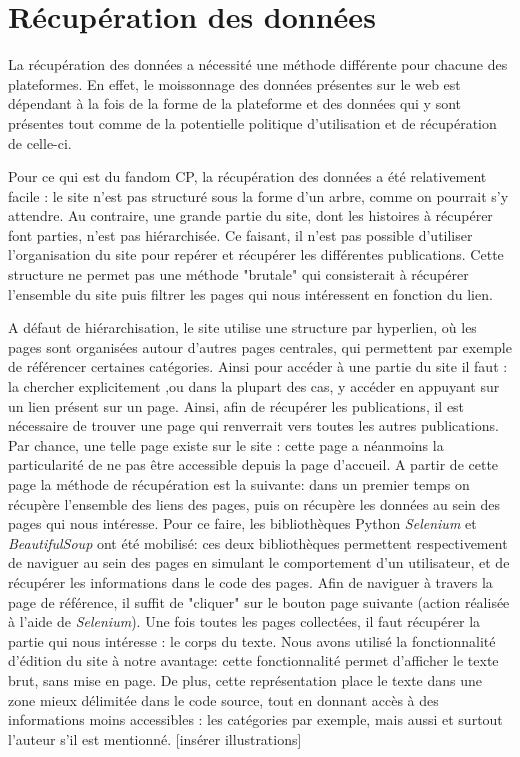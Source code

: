 \documentclass[12pt,a4paper,oneside,titlepage]{article} %
\begin{document}
	
	\section*{Récupération des données}
	
	La récupération des données a nécessité une méthode différente pour chacune des plateformes.  En effet, le moissonnage des données présentes sur le web est dépendant à la fois de la forme de la plateforme et des données qui y sont présentes tout comme de la potentielle politique d'utilisation et de récupération de celle-ci. 
	
	Pour ce qui est du fandom CP, la récupération des données a été relativement facile : le site n'est pas structuré sous la forme d'un arbre, comme on pourrait s'y attendre. Au contraire, une grande partie du site, dont les histoires à récupérer font parties, n'est pas hiérarchisée. Ce faisant, il n'est pas possible d'utiliser l'organisation du site pour repérer et récupérer les différentes publications.
	Cette structure ne permet pas une méthode "brutale" qui consisterait à récupérer l'ensemble du site puis filtrer les pages qui nous intéressent en fonction du lien.
	
	A défaut de hiérarchisation, le site utilise une structure par hyperlien, où les pages sont organisées autour d'autres pages centrales, qui permettent par exemple de référencer certaines catégories. Ainsi pour accéder à une partie du site il faut : la chercher explicitement ,ou dans la plupart des cas, y accéder en appuyant sur un lien présent sur un page. 
	Ainsi, afin de récupérer les publications, il est nécessaire de trouver une page qui renverrait vers toutes les autres publications. Par chance, une telle page existe sur le site : cette page a néanmoins la particularité de ne pas être accessible depuis la page d'accueil.
	A partir de cette page la méthode de récupération est la suivante: dans un premier temps on récupère l'ensemble des liens des pages, puis on récupère les données au sein des pages qui nous intéresse. 
	Pour ce faire, les bibliothèques Python \emph{Selenium} et \emph{BeautifulSoup} ont été mobilisé: ces deux bibliothèques permettent respectivement de naviguer au sein des pages en simulant le comportement d'un utilisateur, et de récupérer les informations dans le code des pages. 
	Afin de naviguer à travers la page de référence, il suffit de "cliquer" sur le bouton page suivante (action réalisée à l'aide de \emph{Selenium}). Une fois toutes les pages collectées, il faut récupérer la partie qui nous intéresse : le corps du texte. 
	Nous avons utilisé la fonctionnalité d'édition du site à notre avantage: cette fonctionnalité permet d'afficher le texte brut, sans mise en page. De plus, cette représentation place le texte dans une zone mieux délimitée dans le code source, tout en donnant accès à des informations moins accessibles : les catégories par exemple, mais aussi et surtout l'auteur s'il est mentionné. 
	[insérer illustrations]
	
\end{document}
